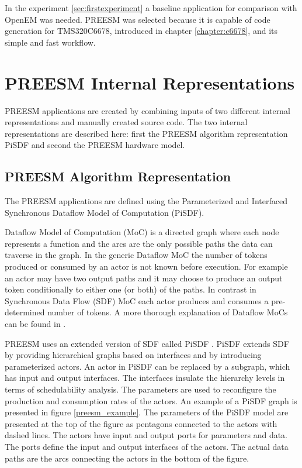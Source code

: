 In the experiment \ref{sec:firstexperiment} a baseline application for comparison
with OpenEM was needed. PREESM was selected because it is capable of code
generation for TMS320C6678, introduced in chapter \ref{chapter:c6678}, and its
simple and fast workflow.

\section{PREESM Internal Representations}
\label{sec:dataflow}
PREESM applications are created by combining inputs of two different
internal representations and manually created source code. The two internal
representations are described here: first the PREESM algorithm representation
PiSDF and second the PREESM hardware model.

\subsection{PREESM Algorithm Representation}
The PREESM applications are defined using the Parameterized and Interfaced
Synchronous Dataflow Model of Computation (PiSDF)\cite{pelcat2014preesm}.

Dataflow Model of Computation (MoC) is a directed graph where each node
represents a function and the arcs are the only possible paths the data can
traverse in the graph. In the generic Dataflow MoC the number of tokens produced
or consumed by an actor is not known before execution. For example an actor may
have two output paths and it may choose to produce an output token conditionally
to either one (or both) of the paths. In contrast in Synchronous Data Flow
(SDF) MoC each actor produces and consumes a pre-determined number of tokens.
\cite{lee1987synchronous} A more thorough explanation of Dataflow MoCs can be
found in \cite{lee2015introduction}.

PREESM uses an extended version of SDF called PiSDF \cite{pelcat2014preesm}.
PiSDF extends SDF by providing hierarchical graphs based on interfaces and by
introducing parameterized actors. An actor in PiSDF can be replaced by a
subgraph, which has input and output interfaces. The interfaces insulate the
hierarchy levels in terms of schedulability analysis. The parameters are used
to reconfigure the production and consumption rates of the actors.
\cite{desnos2013pimm} An example of a PiSDF graph is presented in figure
\ref{preesm_example}. The parameters of the PiSDF model are presented at the
top of the figure as pentagons connected to the actors with dashed lines. The
actors have input and output ports for parameters and data. The ports define
the input and output interfaces of the actors. The actual data paths are the
arcs connecting the actors in the bottom of the figure.


